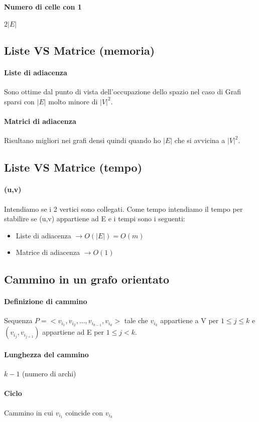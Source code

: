 \paragraph*{Numero di celle con 1} $2|E|$
\subsection{Liste VS Matrice (memoria)}
\paragraph*{Liste di adiacenza} Sono ottime dal punto di vista dell'occupazione dello spazio 
nel caso di Grafi sparsi con $|E|$ molto minore di $|V|^2$.
\paragraph*{Matrici di adiacenza} Risultano migliori nei grafi densi quindi quando ho
$|E|$ che si avvicina a $|V|^2$.
\subsection{Liste VS Matrice (tempo)}
\paragraph*{(u,v)} Intendiamo se i 2 vertici sono collegati.
Come tempo intendiamo il tempo per stabilire se (u,v) appartiene ad E e i tempi
sono i seguenti:
\begin{itemize}
    \item Liste di adiacenza $\rightarrow O(|E|) = O(m)$
    \item Matrice di adiacenza $\rightarrow O(1)$
\end{itemize}
\subsection{Cammino in un grafo orientato}
\paragraph*{Definizione di cammino} Sequenza $P=<v_{i_1},v_{i_2},..., v_{i_{k-1}},v_{i_k}>$
tale che $v_{i_k}$ appartiene a V per $1\leq j \leq k$ e $(v_{i_j},v_{i_{j+1}})$ appartiene
ad E per $1 \leq j < k$.
\paragraph*{Lunghezza del cammino} $k-1$ (numero di archi)
\paragraph*{Ciclo} Cammino in cui $v_{i_1}$ coincide con $v_{i_k}$
